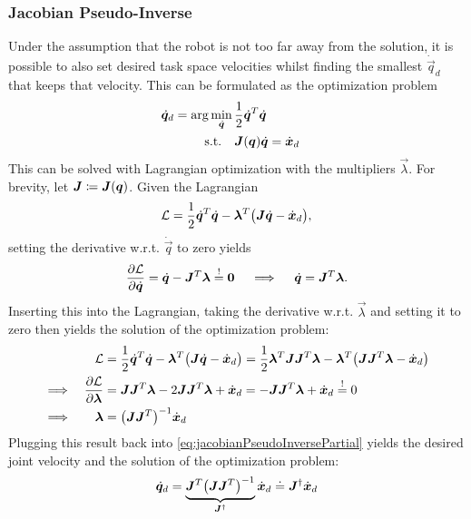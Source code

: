 			\subsubsection{Jacobian Pseudo-Inverse}
				Under the assumption that the robot is not too far away from the solution, it is possible to also set desired task space velocities whilst finding the smallest \( \dot{\vec{q}}_d \) that keeps that velocity. This can be formulated as the optimization problem
				\begin{equation}
					\begin{aligned}
						\dot{\bm{q}}_d = \arg\min_{\dot{\bm{q}}} \,& \frac{1}{2} \dot{\bm{q}}^T \dot{\bm{q}} \\
						\mathrm{s.t.} \quad&
							\begin{aligned}[t]
								\bm{J}(\bm{q}) \dot{\bm{q}} &= \dot{\bm{x}}_d
							\end{aligned}
					\end{aligned}  \label{eq:jacobianPseudoInverseOptProblem}
				\end{equation}
				This can be solved with Lagrangian optimization with the multipliers \( \vec{\lambda} \). For brevity, let \( \bm{J} \coloneqq \bm{J}(\bm{q}) \). Given the Lagrangian
				\begin{equation*}
					\mathcal{L} = \frac{1}{2} \dot{\bm{q}}^T \dot{\bm{q}} - \bm{\lambda}^T \big( \bm{J} \dot{\bm{q}} - \dot{\bm{x}}_d \big),
				\end{equation*}
				setting the derivative w.r.t. \( \dot{\vec{q}} \) to zero yields
				\begin{equation}
					\pdv{\mathcal{L}}{\dot{\bm{q}}} = \dot{\bm{q}} - \bm{J}^T \bm{\lambda} \overset{!}{=} \bm{0}
					\quad\implies\quad
					\dot{\bm{q}} = \bm{J}^T \bm{\lambda}.  \label{eq:jacobianPseudoInversePartial}
				\end{equation}
				Inserting this into the Lagrangian, taking the derivative w.r.t. \( \vec{\lambda} \) and setting it to zero then yields the solution of the optimization problem:
				\begin{align*}
					&& \mathcal{L} &= \frac{1}{2} \dot{\bm{q}}^T \dot{\bm{q}} - \bm{\lambda}^T \big( \bm{J} \dot{\bm{q}} - \dot{\bm{x}}_d \big) = \frac{1}{2} \bm{\lambda}^T \bm{J} \bm{J}^T \bm{\lambda} - \bm{\lambda}^T \big( \bm{J} \bm{J}^T \bm{\lambda} - \dot{\bm{x}}_d \big) \\
					\implies && \pdv{\mathcal{L}}{\bm{\lambda}} &= \bm{J} \bm{J}^T \bm{\lambda} - 2 \bm{J} \bm{J}^T \bm{\lambda} + \dot{\bm{x}}_d = -\bm{J} \bm{J}^T \bm{\lambda} + \dot{\bm{x}}_d \overset{!}{=} 0 \\
					\implies && \bm{\lambda} &= \big( \bm{J} \bm{J}^T \big)^{-1} \dot{\bm{x}}_d
				\end{align*}
				Plugging this result back into \eqref{eq:jacobianPseudoInversePartial} yields the desired joint velocity and the solution of the optimization problem:
				\begin{equation*}
					\dot{\bm{q}}_d
						= \underbrace{\bm{J}^T \big( \bm{J} \bm{J}^T \big)^{-1}}_{\bm{J}^\dagger} \dot{\bm{x}}_d
						\doteq \bm{J}^\dagger \dot{\bm{x}}_d
				\end{equation*}

